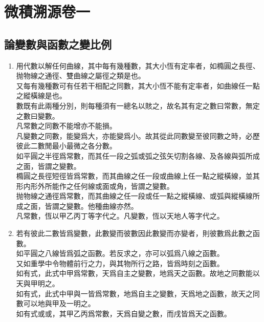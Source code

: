 \chapter {微積溯源卷一}
\setcounter{page}{1}
\section {論變數與函數之變比例}
\thispagestyle{fancy}
\begin{enumerate} [label={第\chinese*款}]
	\item 用代數以解任何曲線，其中每有幾種數，其大小恆有定率者，如橢圓之長徑、抛物線之通徑、雙曲線之屬徑之類是也。\\
	又每有幾種數可有任若干相配之同數，其大小恆不能有定率者，如曲線任一點之縱橫線是也。\\
	數既有此兩種分別，則每種須有一總名以賅之，故名其有定之數曰常數，無定之數曰變數。\\
	凡常數之同數不能增亦不能損。\\
	凡變數之同數，能變爲大，亦能變爲小。故其從此同數變至彼同數之時，必歷彼此二數閒最小最微之各分數。\\
	如平圓之半徑爲常數，而其任一段之弧或弧之弦矢切割各線、及各線與弧所成之面，皆謂之變數。\\
	橢圓之長徑短徑皆爲常數，而其曲線之任一段或曲線上任一點之縱橫線，並其形内形外所能作之任何線或面或角，皆謂之變數。\\
	抛物線之通徑爲常數，而其曲線之任一段或任一點之縱橫線、或弧與縱橫線所成之面，皆謂之變數。他種曲線亦然。\\
	凡常數，恆以甲乙丙丁等字代之。凡變數，恆以天地人等字代之。
	\item 若有彼此二數皆爲變數，此數變而彼數因此數變而亦變者，則彼數爲此數之函數。\\
	如平圓之八線皆爲弧之函數。若反求之，亦可以弧爲八線之函數。\\
	又如重學中令物體前行之力，與其物所行之路，皆爲時刻之函數。\\
	如有式\CJKmove，此式中甲爲常數，天爲自主之變數，地爲天之函數。故地之同數能以天與甲明之。\\
	如有式\CJKmove，此式中甲與一皆爲常數，地爲自主之變數，天爲地之函數，故天之同數可以地與甲及一明之。\\
	如有式\CJKmove 或\CJKmove 或\CJKmove，其甲乙丙爲常數，天爲自變之數，而戌皆爲天之函數。\\

\end{enumerate}
